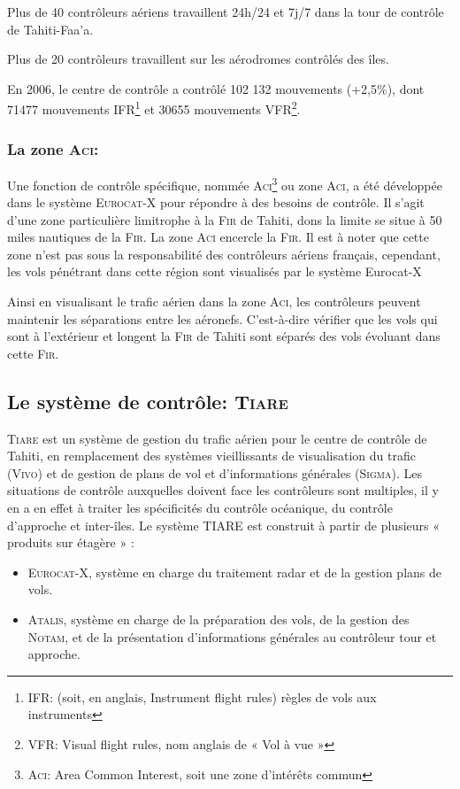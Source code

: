 Plus de 40 contrôleurs aériens travaillent 24h/24 et 7j/7 dans la tour de contrôle de Tahiti-Faa'a.

Plus de 20 contrôleurs travaillent sur les aérodromes contrôlés des îles.

En 2006, le centre de contrôle a contrôlé 102 132 mouvements (+2,5\%), dont 71477 mouvements \textsc{IFR}\footnote{IFR: (soit, en anglais, Instrument flight rules) règles de vols aux instruments} et 30655 mouvements \textsc{VFR}\footnote{VFR: Visual flight rules, nom anglais de « Vol à vue »}.

        \subsubsection{La zone \textsc{Aci}:\label{Aci}}
Une fonction de contrôle spécifique, nommée \textsc{Aci}\footnote{\textsc{Aci}: Area Common Interest, soit une zone d'intérêts commun} ou zone \textsc{Aci}, a été développée dans le système \textsc{Eurocat-X} pour répondre à des besoins de contrôle. Il s’agit d’une zone particulière limitrophe à la \textsc{Fir}  de Tahiti, dons la limite se situe à 50 miles nautiques de la \textsc{Fir}. La zone \textsc{Aci} encercle la \textsc{Fir}. Il est à noter que cette zone n’est pas sous la responsabilité des contrôleurs aériens français, cependant, les vols pénétrant dans cette région sont visualisés par le système Eurocat-X 

Ainsi en visualisant le trafic aérien dans la zone \textsc{Aci}, les contrôleurs peuvent maintenir les séparations entre les aéronefs. C'est-à-dire vérifier que les vols qui sont à l’extérieur et longent la \textsc{Fir} de Tahiti sont séparés des vols évoluant dans cette \textsc{Fir}.

    \subsection{Le système de contrôle: \textsc{Tiare}}
\textsc{Tiare} est un système de gestion du trafic aérien pour le centre de contrôle de Tahiti, en remplacement des systèmes vieillissants de visualisation du trafic (\textsc{Vivo}) et de gestion de plans de vol et d’informations générales (\textsc{Sigma}). Les situations de contrôle auxquelles doivent face les contrôleurs sont multiples, il y en a en effet à traiter les spécificités du contrôle océanique, du contrôle d’approche et inter-îles. Le système TIARE est construit à partir de plusieurs « produits sur étagère » :
\begin{itemize}
  \item \textsc{Eurocat-X}, système en charge du traitement radar et de la gestion plans de vols.
  \item \textsc{Atalis}, système en charge de la préparation des vols, de la gestion des \textsc{Notam}, et de la présentation d’informations générales au contrôleur tour et approche.
\end{itemize}\medskip

